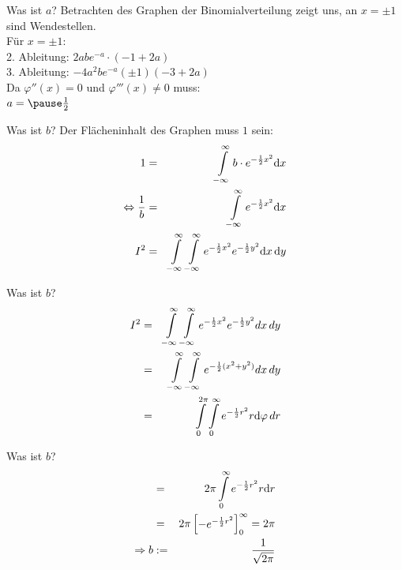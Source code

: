 \documentclass[14pt]{beamer}
\begin{document}
\begin{frame}{Was ist $a$?}
Betrachten des Graphen der Binomialverteilung zeigt uns, an $x=\pm 1$ sind Wendestellen.\\
Für $x=\pm 1$:\\
2. Ableitung: $2abe^{-a} \cdot (-1+2 a)$\\
3. Ableitung: $-4 a^{2} b e^{-a} (\pm1) (-3+2 a)$\\

Da $\varphi''(x)=0$ und $\varphi'''(x)\neq0$ muss:\\
$a=\pause\frac{1}{2}$
\end{frame}

\begin{frame}{Was ist $b$?}
Der Flächeninhalt des Graphen muss $1$ sein:
\begin{eqnarray}
1&=&\int\displaylimits^{\infty}_{-\infty} b \cdot e^{-\frac{1}{2}x^2} {\mathrm d}x \\
\Leftrightarrow \frac{1}{b}&=&\int\displaylimits^{\infty}_{-\infty} e^{-\frac{1}{2}x^2} {\mathrm d}x \\
I^2 &=& \int\displaylimits^{\infty}_{-\infty} \int\displaylimits^{\infty}_{-\infty} e^{-\frac{1}{2}x^2} e^{-\frac{1}{2}y^2} {\mathrm d}x \, {\mathrm d}y
\end{eqnarray}
\end{frame}

\begin{frame}[allowframebreaks]{Was ist $b$?}
\small
\begin{eqnarray}
I^2 &=& \int\displaylimits^{\infty}_{-\infty} \int\displaylimits^{\infty}_{-\infty} e^{-\frac{1}{2}x^2} e^{-\frac{1}{2}y^2} dx \, dy \\
&=& \int\displaylimits^{\infty}_{-\infty} \int\displaylimits^{\infty}_{-\infty} e^{-\frac{1}{2}(x^2 + y^2)} dx \, dy \\ 
&=& \int\displaylimits^{2 \pi}_{0} \int\displaylimits^{\infty}_{0} e^{-\frac{1}{2}r^2} r{\mathrm d}\varphi \, dr
\end{eqnarray}
\end{frame}

\begin{frame}[allowframebreaks]{Was ist $b$?}
\small
\begin{eqnarray}
&=& 2 \pi \int\displaylimits^{\infty}_{0} e^{-\frac{1}{2}r^2} r{\mathrm d}r \\
&=& 2 \pi \begin{bmatrix}-e^{-\frac{1}{2} r^2} \end{bmatrix}^\infty_0 = 2 \pi\\
\Rightarrow b&:=&\frac{1}{\sqrt{2\pi}}
\end{eqnarray}
\end{frame}
\end{document}
